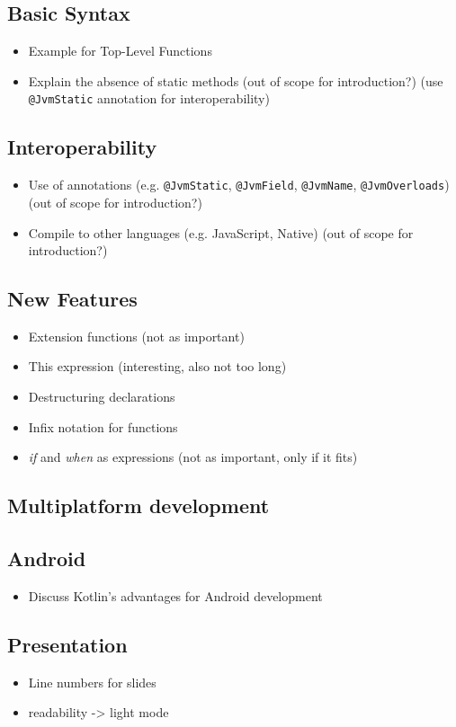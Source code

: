 \documentclass[a4paper,11pt]{article}
\begin{document}
  \subsection{Basic Syntax}
    \begin{itemize}
      \item Example for Top-Level Functions
      \item Explain the absence of static methods (out of scope for introduction?) (use \texttt{@JvmStatic} annotation for interoperability)
    \end{itemize}

  \subsection{Interoperability}
    \begin{itemize}
      \item Use of annotations (e.g. \texttt{@JvmStatic}, \texttt{@JvmField}, \texttt{@JvmName}, \texttt{@JvmOverloads}) (out of scope for introduction?)
      \item Compile to other languages (e.g. JavaScript, Native) (out of scope for introduction?)
    \end{itemize}

  \subsection{New Features}
    \begin{itemize}
      \item Extension functions (not as important)
      \item This expression (interesting, also not too long)
      \item Destructuring declarations
      \item Infix notation for functions
      \item \textit{if} and \textit{when} as expressions (not as important, only if it fits)
    \end{itemize}

  \subsection{Multiplatform development}
  
  \subsection{Android}
    \begin{itemize}
      \item Discuss Kotlin's advantages for Android development
    \end{itemize}

  \subsection{Presentation}
  \begin{itemize}
    \item Line numbers for slides
    \item readability -> light mode
  \end{itemize}
\end{document}
